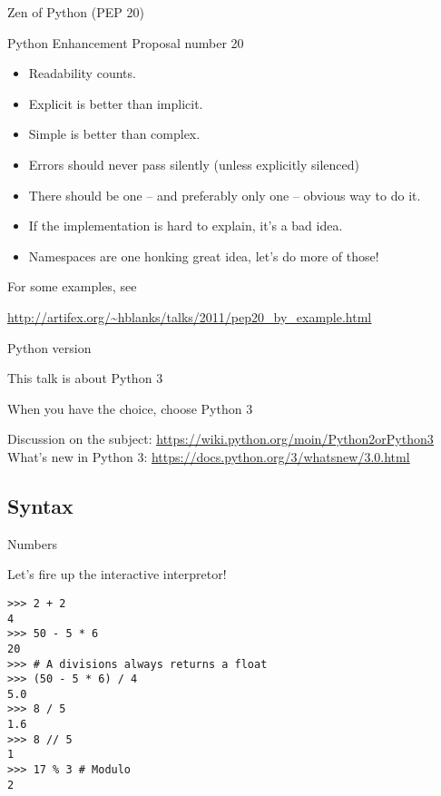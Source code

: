 \documentclass[ignorenonframetext,]{beamer}
\newcommand{\myurl}[1]{\textcolor{blue}{\underline{\url{#1}}}}
\begin{document}
\begin{frame}{Zen of Python (PEP 20)}

    Python Enhancement Proposal number 20

    \begin{itemize}[<+-| alert@+>]
        \item Readability counts.
        \item Explicit is better than implicit.
        \item Simple is better than complex.
        \item Errors should never pass silently (unless explicitly silenced)
        \item There should be one -- and preferably only one -- obvious way to do it.
        \item If the implementation is hard to explain, it's a bad idea.
        \item Namespaces are one honking great idea, let's do more of those!
    \end{itemize}
\end{frame}

\begin{frame}%

    For some examples, see

    \myurl{http://artifex.org/~hblanks/talks/2011/pep20_by_example.html}

\end{frame}

\begin{frame}{Python version}

    This talk is about {\LARGE Python} {\Huge 3}

    When you have the choice, choose Python 3

    Discussion on the subject: \myurl{https://wiki.python.org/moin/Python2orPython3}\\

    What's new in Python 3: \myurl{https://docs.python.org/3/whatsnew/3.0.html}

\end{frame}

\subsection{Syntax}

\begin{frame}[fragile]{Numbers}

    Let's fire up the interactive interpretor!

    \begin{verbatim}
>>> 2 + 2
4
>>> 50 - 5 * 6
20
>>> # A divisions always returns a float
>>> (50 - 5 * 6) / 4
5.0
>>> 8 / 5
1.6
>>> 8 // 5
1
>>> 17 % 3 # Modulo
2
    \end{verbatim}
\end{frame}
\end{document}
